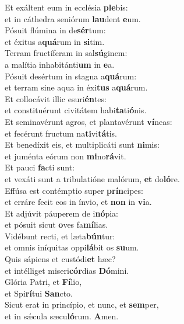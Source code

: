 \evenverse Et exáltent eum in ecclésia \textbf{ple}bis:~\*\\
\evenverse et in cáthedra seniórum \textbf{lau}dent \textbf{e}um.\\
\oddverse Pósuit flúmina in de\textbf{sér}tum:~\*\\
\oddverse et éxitus a\textbf{quá}rum in \textbf{si}tim.\\
\evenverse Terram fructíferam in sal\textbf{sú}ginem:~\*\\
\evenverse a malítia inhabitánti\textbf{um} in \textbf{e}a.\\
\oddverse Pósuit desértum in stagna a\textbf{quá}rum:~\*\\
\oddverse et terram sine aqua in éxi\textbf{tus} a\textbf{quá}rum.\\
\evenverse Et collocávit illic esuri\textbf{én}tes:~\*\\
\evenverse et constituérunt civitátem habi\textbf{ta}ti\textbf{ó}nis.\\
\oddverse Et seminavérunt agros, et plantavérunt \textbf{ví}neas:~\*\\
\oddverse et fecérunt fructum na\textbf{ti}vi\textbf{tá}tis.\\
\evenverse Et benedíxit eis, et multiplicáti sunt \textbf{ni}mis:~\*\\
\evenverse et juménta eórum non \textbf{mi}no\textbf{rá}vit.\\
\oddverse Et pauci \textbf{fa}cti sunt:~\*\\
\oddverse et vexáti sunt a tribulatióne malórum, \textbf{et} do\textbf{ló}re.\\
\evenverse Effúsa est contémptio super \textbf{prín}cipes:~\*\\
\evenverse et erráre fecit eos in ínvio, et \textbf{non} in \textbf{vi}a.\\
\oddverse Et adjúvit páuperem de i\textbf{nó}pia:~\*\\
\oddverse et pósuit sicut \textbf{o}ves fa\textbf{mí}lias.\\
\evenverse Vidébunt recti, et læta\textbf{bún}tur:~\*\\
\evenverse et omnis iníquitas oppi\textbf{lá}bit os \textbf{su}um.\\
\oddverse Quis sápiens et custódi\textbf{et} hæc?~\*\\
\oddverse et intélliget miseri\textbf{cór}dias \textbf{Dó}mini.\\
\evenverse Glória Patri, et \textbf{Fí}lio,~\*\\
\evenverse et Spi\textbf{rí}tui \textbf{San}cto.\\
\oddverse Sicut erat in princípio, et nunc, et \textbf{sem}per,~\*\\
\oddverse et in sǽcula sæcu\textbf{ló}rum. \textbf{A}men.\\
